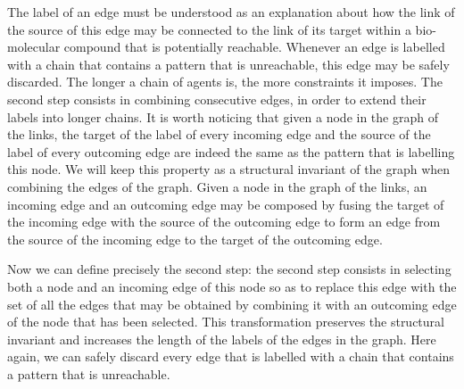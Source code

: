 \documentclass{entcs}
\begin{document}
The label of an edge must be understood as an explanation about how the link of the source of this edge may be connected to the link of its target within a bio-molecular compound that is potentially reachable. Whenever an edge is labelled with a chain that contains a pattern that is unreachable, this edge may be safely discarded.
The longer a chain of agents is, the more constraints it imposes. The second step consists in combining consecutive edges, in order to extend their labels into longer chains. It is worth noticing that given a node in the graph of the links, the target of the label of every incoming edge and the source of the label of every outcoming edge are indeed the same as the pattern that is labelling this node.
We will keep this property as a structural invariant of the graph when combining the edges of the graph. Given a node in the graph of the links, an incoming edge and an outcoming edge may be composed by fusing the target of the incoming edge with the source of the outcoming edge to form an edge from the source of the incoming edge to the target of the outcoming edge.

Now we can define precisely the second step: the second step consists in
selecting both a node and an incoming edge of this node so as to replace this edge with the set of all the edges that may be obtained by combining it with an outcoming edge of the node that has been selected. This transformation preserves the structural invariant and increases the length of the labels of the edges in the graph. Here again, we can safely discard every edge that is labelled with a chain that contains a pattern that is unreachable.
\end{document}
